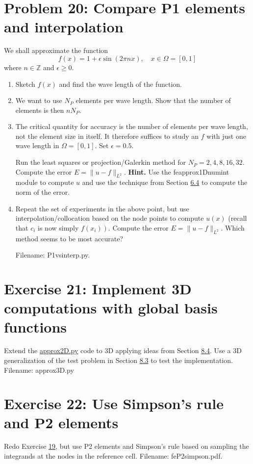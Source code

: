 \documentclass[../main.tex]{subfiles}
\begin{document}
\section*{Problem 20: Compare P1 elements and interpolation}
\label{sec:sec_10_20}
\noindent We shall approximate the function
$$
f(x)=1+\epsilon \sin (2 \pi n x), \quad x \in \Omega=[0,1]
$$
where $n \in \mathbb{Z}$ and $\epsilon \geq 0$.
\begin{enumerate}[label=(\alph*)]
	\item Sketch $f(x)$ and find the wave length of the function.
	\item We want to use $N_{P}$ elements per wave length. Show that the number of elements is then $n N_{P}$.
	\item The critical quantity for accuracy is the number of elements per wave length, not the element size in itself. It therefore suffices to study an $f$ with just one wave length in $\Omega=[0,1]$. Set $\epsilon=0.5$.
	
	Run the least squares or projection/Galerkin method for $N_{P}=2,4,8,16,32$. Compute the error $E=\|u-f\|_{L^{2}}$.
	\bigbreak
	\textbf{Hint.} Use the fe\textunderscore approx1D\textunderscore numint module to compute $u$ and use the technique from Section \hyperref[sec:sec_6_4]{6.4} to compute the norm of the error.
	\item Repeat the set of experiments in the above point, but use interpolation/collocation based on the node points to compute $u(x)$ (recall that $c_{i}$ is now simply $\left.f\left(x_{i}\right)\right)$. Compute the error $E=\|u-f\|_{L^{2}}$. Which method seems to be most accurate?
	
	Filename: P1\textunderscore vs\textunderscore interp.py.
\end{enumerate}
\bigbreak
\section*{Exercise 21: Implement 3D computations with global basis functions}
\label{sec:sec_10_21}
\noindent Extend the \href{http://tinyurl.com/jvzzcfn/fem/approx2D.py}{approx2D.py} code to 3D applying ideas from Section \hyperref[sec:sec_8_4]{8.4}. Use a
3D generalization of the test problem in Section \hyperref[sec:sec_8_3]{8.3} to test the implementation.
Filename: approx3D.py
\bigbreak
\section*{Exercise 22: Use Simpson's rule and P2 elements}
\label{sec:sec_10_22}
\noindent Redo Exercise \hyperref[sec:sec_10_19]{19}, but use P2 elements and Simpson's rule based on sampling
the integrands at the nodes in the reference cell.
Filename: fe\textunderscore P2\textunderscore simpson.pdf.
\end{document}
